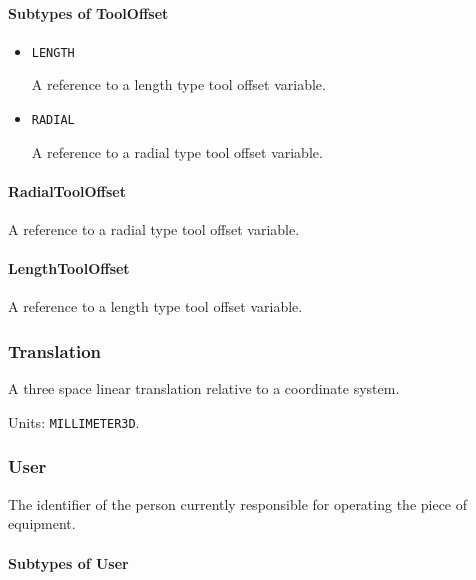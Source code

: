 \paragraph{Subtypes of ToolOffset}\mbox{}
\label{sec:Subtypes of ToolOffset}

\begin{itemize}

\item \texttt{LENGTH}


A reference to a length type tool offset variable.

\item \texttt{RADIAL}


A reference to a radial type tool offset variable.


\end{itemize}

\paragraph{RadialToolOffset}\mbox{}
\label{sec:RadialToolOffset}


A reference to a radial type tool offset variable.


\paragraph{LengthToolOffset}\mbox{}
\label{sec:LengthToolOffset}


A reference to a length type tool offset variable.


\subsubsection{Translation}




A three space linear translation relative to a coordinate system.



Units: \texttt{MILLIMETER\textunderscore 3D}.

\subsubsection{User}
\label{sec:User}



The identifier of the person currently responsible for operating the piece of equipment.


\paragraph{Subtypes of User}\mbox{}
\label{sec:Subtypes of User}

